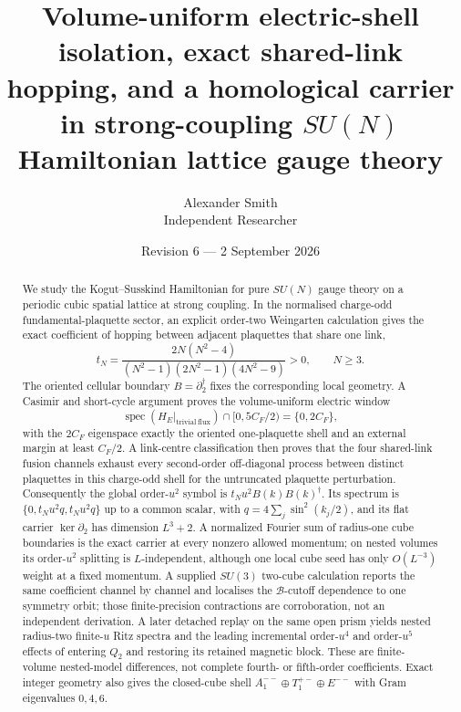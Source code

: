 \documentclass[11pt]{article}
\theoremstyle{plain}
\theoremstyle{definition}
\theoremstyle{remark}
\newcommand{\dg}{^{\dagger}}
\begin{document}
\title{\bfseries Volume-uniform electric-shell isolation, exact shared-link
hopping, and a homological carrier\\
in strong-coupling $SU(N)$ Hamiltonian lattice gauge theory}
\author{Alexander Smith\\ \small Independent Researcher}
\date{Revision 6 --- 2 September 2026}
\maketitle

\begin{abstract}
\noindent
We study the Kogut--Susskind Hamiltonian for pure $SU(N)$ gauge theory on a
periodic cubic spatial lattice at strong coupling. In the normalised
charge-odd fundamental-plaquette sector, an explicit order-two Weingarten
calculation gives the exact coefficient of hopping between adjacent
plaquettes that share one link,
\[
  t_N=\frac{2N(N^2-4)}{(N^2-1)(2N^2-1)(4N^2-9)}>0,\qquad N\ge 3 .
\]
The oriented cellular boundary $B=\partial_2\dg$ fixes the corresponding local
geometry. A Casimir and short-cycle argument proves the volume-uniform electric
window
\[
 \operatorname{spec}(H_E|_{\mathrm{trivial\ flux}})
 \cap[0,5C_F/2)=\{0,2C_F\},
\]
with the $2C_F$ eigenspace exactly the oriented one-plaquette shell and an
external margin at least $C_F/2$. A link-centre classification then proves that
the four shared-link fusion channels exhaust every second-order off-diagonal
process between distinct plaquettes in this charge-odd shell for the
untruncated plaquette perturbation. Consequently
the global order-$u^2$ symbol is $t_Nu^2B(k)B(k)\dg$. Its spectrum is
$\{0,t_Nu^2q,t_Nu^2q\}$ up to a common scalar, with
$q=4\sum_j\sin^2(k_j/2)$, and its flat carrier
$\ker\partial_2$ has dimension $L^3+2$. A normalized Fourier sum of radius-one
cube boundaries is the exact carrier at every nonzero allowed momentum; on
nested volumes its order-$u^2$ splitting is $L$-independent, although one local
cube seed has only $O(L^{-3})$ weight at a fixed momentum. A supplied $SU(3)$ two-cube
calculation reports the same coefficient channel by channel and localises the
$\mathcal B$-cutoff dependence to one symmetry orbit; those finite-precision
contractions are corroboration, not an independent derivation. A later
detached replay on the same open prism yields nested radius-two finite-$u$
Ritz spectra and the leading incremental order-$u^4$ and order-$u^5$ effects
of entering $Q_2$ and restoring its retained magnetic block. These are
finite-volume nested-model differences, not complete fourth- or fifth-order
coefficients. Exact integer geometry also
gives the closed-cube shell
$A_1^{--}\oplus T_1^{+-}\oplus E^{--}$ with Gram eigenvalues $0,4,6$.


\end{abstract}
\end{document}
